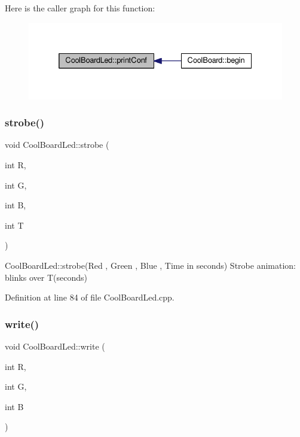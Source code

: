 Here is the caller graph for this function\+:
\nopagebreak
\begin{figure}[H]
\begin{center}
\leavevmode
\includegraphics[width=332pt]{de/dc0/class_cool_board_led_a8ed3053a36f0ed4a131f43b5b17efb61_icgraph}
\end{center}
\end{figure}
\mbox{\label{class_cool_board_led_adc08c0ac07473499971c503d300f0413}} 
\subsubsection{\texorpdfstring{strobe()}{strobe()}}
{\footnotesize\ttfamily void Cool\+Board\+Led\+::strobe (\begin{DoxyParamCaption}\item[{int}]{R,  }\item[{int}]{G,  }\item[{int}]{B,  }\item[{int}]{T }\end{DoxyParamCaption})}

Cool\+Board\+Led\+::strobe(\+Red , Green , Blue , Time in seconds) Strobe animation\+: blinks over T(seconds) 

Definition at line 84 of file Cool\+Board\+Led.\+cpp.

\mbox{\label{class_cool_board_led_a30fadd4cbec17ceea428bf7a32207e87}} 
\subsubsection{\texorpdfstring{write()}{write()}}
{\footnotesize\ttfamily void Cool\+Board\+Led\+::write (\begin{DoxyParamCaption}\item[{int}]{R,  }\item[{int}]{G,  }\item[{int}]{B }\end{DoxyParamCaption})}

